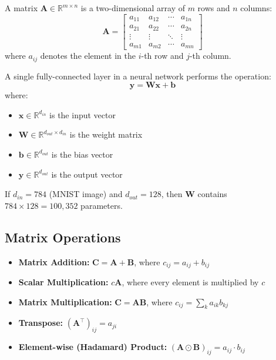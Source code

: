 \begin{definition}[Matrix]
A matrix $\mathbf{A} \in \mathbb{R}^{m \times n}$ is a two-dimensional array of $m$ rows and $n$ columns:
\begin{equation}
\mathbf{A} = \begin{bmatrix}
a_{11} & a_{12} & \cdots & a_{1n} \\
a_{21} & a_{22} & \cdots & a_{2n} \\
\vdots & \vdots & \ddots & \vdots \\
a_{m1} & a_{m2} & \cdots & a_{mn}
\end{bmatrix}
\end{equation}
where $a_{ij}$ denotes the element in the $i$-th row and $j$-th column.
\end{definition}

\begin{example}
A single fully-connected layer in a neural network performs the operation:
\begin{equation}
\mathbf{y} = \mathbf{W}\mathbf{x} + \mathbf{b}
\end{equation}
where:
\begin{itemize}
    \item $\mathbf{x} \in \mathbb{R}^{d_{in}}$ is the input vector
    \item $\mathbf{W} \in \mathbb{R}^{d_{out} \times d_{in}}$ is the weight matrix
    \item $\mathbf{b} \in \mathbb{R}^{d_{out}}$ is the bias vector
    \item $\mathbf{y} \in \mathbb{R}^{d_{out}}$ is the output vector
\end{itemize}
If $d_{in} = 784$ (MNIST image) and $d_{out} = 128$, then $\mathbf{W}$ contains $784 \times 128 = 100,352$ parameters.
\end{example}

\subsection{Matrix Operations}

\begin{itemize}
    \item \textbf{Matrix Addition:} $\mathbf{C} = \mathbf{A} + \mathbf{B}$, where $c_{ij} = a_{ij} + b_{ij}$
    \item \textbf{Scalar Multiplication:} $c\mathbf{A}$, where every element is multiplied by $c$
    \item \textbf{Matrix Multiplication:} $\mathbf{C} = \mathbf{AB}$, where $c_{ij} = \sum_{k} a_{ik}b_{kj}$
    \item \textbf{Transpose:} $(\mathbf{A}^\top)_{ij} = a_{ji}$
    \item \textbf{Element-wise (Hadamard) Product:} $(\mathbf{A} \odot \mathbf{B})_{ij} = a_{ij} \cdot b_{ij}$
\end{itemize}

